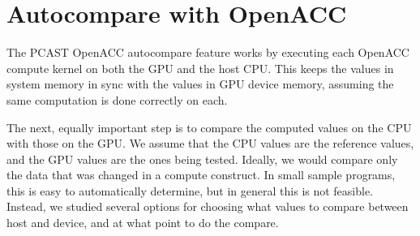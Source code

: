 \section{Autocompare with OpenACC}

The PCAST OpenACC autocompare feature works by executing each OpenACC compute kernel on both the GPU and the host CPU.
This keeps the values in system memory in sync with the values in GPU device memory, assuming the same computation is done correctly on each.

The next, equally important step is to compare the computed values on the CPU with those on the GPU.
We assume that the CPU values are the reference values, and the GPU values are the ones being tested.
Ideally, we would compare only the data that was changed in a compute construct.
In small sample programs, this is easy to automatically determine, but in general this is not feasible.
Instead, we studied several options for choosing what values to compare between host and device, and at what point to do the compare.
